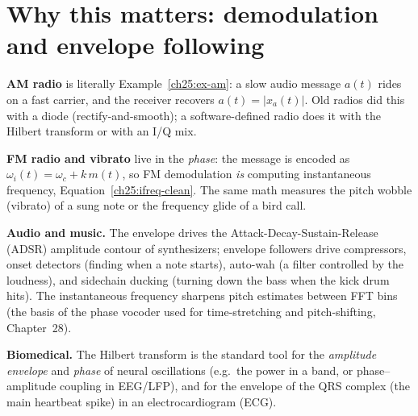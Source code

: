 \section{Why this matters: demodulation and envelope following}
\label{ch25:applications}

\begin{applicationbox}
\textbf{AM radio} is literally Example~\ref{ch25:ex-am}: a slow audio message $a(t)$
rides on a fast carrier, and the receiver recovers $a(t)=|x_a(t)|$. Old radios did this
with a diode (rectify-and-smooth); a software-defined radio does it with the Hilbert
transform or with an I/Q mix.

\textbf{FM radio and vibrato} live in the \emph{phase}: the message is encoded as
$\omega_i(t)=\omega_c + k\,m(t)$, so FM demodulation \emph{is} computing instantaneous
frequency, Equation~\eqref{ch25:ifreq-clean}. The same math measures the pitch wobble
(vibrato) of a sung note or the frequency glide of a bird call.

\textbf{Audio and music.} The envelope drives the Attack-Decay-Sustain-Release (ADSR) amplitude contour of synthesizers; envelope
followers drive compressors, onset detectors (finding when a note starts), auto-wah (a filter controlled by the loudness), and sidechain ducking (turning down the bass when the kick drum hits). The
instantaneous frequency sharpens pitch estimates between FFT bins (the basis of the
phase vocoder used for time-stretching and pitch-shifting, Chapter~28).

\textbf{Biomedical.} The Hilbert transform is the standard tool for the \emph{amplitude
envelope} and \emph{phase} of neural oscillations (e.g.\ the power in a band, or
phase--amplitude coupling in EEG/LFP), and for the envelope of the QRS complex (the main heartbeat spike) in an electrocardiogram (ECG).
\end{applicationbox}

